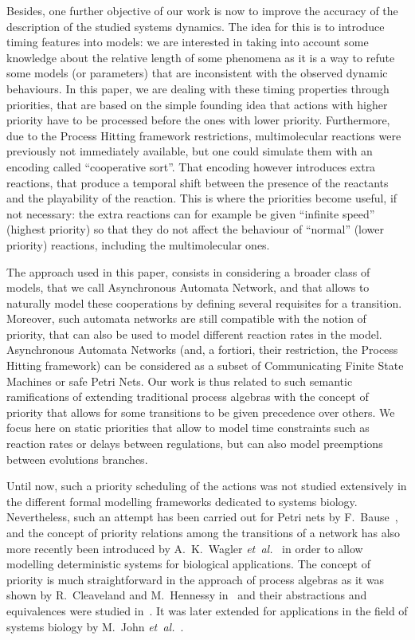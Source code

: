 Besides, one further objective of our work is now %
to improve the accuracy of the description of the studied systems dynamics.
The idea for this is to introduce timing features into models:
we are interested in taking into account some knowledge about the relative length of some phenomena as it is a way to refute some models (or parameters) that are inconsistent with the observed dynamic behaviours.
In this paper, we are dealing with these timing properties through priorities,
that are based on the simple founding idea that actions with higher priority have to be processed before the ones with lower priority.
Furthermore, due to the Process Hitting framework restrictions, multimolecular reactions were previously not immediately available, but one could simulate them with an encoding called “cooperative sort”.
That encoding however introduces extra reactions,
that produce a temporal shift between the presence of the reactants
and the playability of the reaction.
This is where the priorities become useful, if not necessary:
the extra reactions can for example be given “infinite speed” (highest priority) so that they do not affect the behaviour of “normal” (lower priority) reactions, including the multimolecular ones.

The approach used in this paper, 
consists in considering a broader class of models,
that we call Asynchronous Automata Network,
and that allows to naturally model these cooperations
by defining several requisites for a transition.
Moreover, such automata networks are still compatible with the notion of priority,
that can also be used to model different reaction rates in the model.
Asynchronous Automata Networks
(and, a fortiori, their restriction, the Process Hitting framework)
can be considered as a subset of Communicating Finite State Machines
or safe Petri Nets.
Our work is thus related to such semantic ramifications
of extending traditional process algebras with the concept of priority
that allows for some transitions to be given precedence over others.
We focus here on static priorities that allow to model
time constraints such as reaction rates or delays between regulations,
but can also model preemptions between evolutions branches.

Until now, such a priority scheduling of the actions was not studied extensively in the different formal modelling frameworks dedicated to systems biology.
Nevertheless, such an attempt has been carried out for Petri nets by F.~Bause~\cite{Bause97},
and the concept of priority relations among the transitions of a network has also more recently been introduced by A.~K.~Wagler \textit{et~al.}~\cite{waw,WaglerW12} in order to allow modelling deterministic systems for biological applications.
The concept of priority is much straightforward in the approach of process algebras as it was shown by R.~Cleaveland and M.~Hennessy in~\cite{Cleaveland199058,Cleaveland99prioritiesin} and their abstractions and equivalences were studied in~\cite{Cleaveland:2007:PAP:1282576.1282847}.
It was later extended for applications in the field of systems biology by M.~John \textit{et~al.}~\cite{jlnu2010}.

